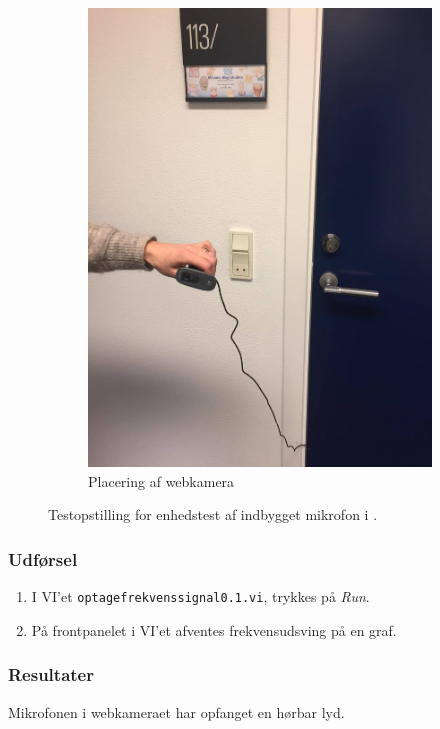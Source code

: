 \begin{figure}
\begin{subfigure}[b]{0.4\textwidth}
			\includegraphics[width=\textwidth]{webcam1}
			\caption{Placering af webkamera}
			\label{fig:webop2}
			\end{subfigure}	
		\caption{Testopstilling for enhedstest af indbygget mikrofon i \webcammic.}	
		\label{fig:webop}
		\end{figure}
	
		\subsubsection{Udførsel}
			\begin{enumerate}
				\item I VI'et \texttt{optagefrekvenssignal0.1.vi}, trykkes på \textit{Run}.  
				\item På frontpanelet i VI'et afventes frekvensudsving på en graf. 
			\end{enumerate}
		
		\subsubsection{Resultater}
		Mikrofonen i webkameraet har opfanget en hørbar lyd.  
		
